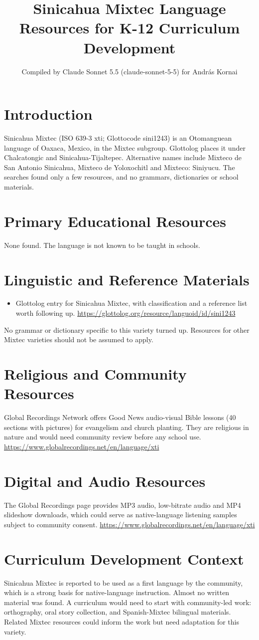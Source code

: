 \documentclass[12pt]{article}
\title{Sinicahua Mixtec Language Resources for K-12 Curriculum Development}
\author{Compiled by Claude Sonnet 5.5 (claude-sonnet-5-5) for Andr\'as Kornai}
\date{}
\begin{document}
\maketitle

\section{Introduction}
Sinicahua Mixtec (ISO 639-3 xti; Glottocode sini1243) is an Otomanguean language of Oaxaca, Mexico, in the Mixtec subgroup. Glottolog places it under Chalcatongic and Sinicahua-Tijaltepec. Alternative names include Mixteco de San Antonio Sinicahua, Mixteco de Yoloxochitl and Mixteco: Siniyucu. The searches found only a few resources, and no grammars, dictionaries or school materials.

\section{Primary Educational Resources}
None found. The language is not known to be taught in schools.

\section{Linguistic and Reference Materials}
\begin{itemize}
\item Glottolog entry for Sinicahua Mixtec, with classification and a reference list worth following up. \url{https://glottolog.org/resource/languoid/id/sini1243}
\end{itemize}
No grammar or dictionary specific to this variety turned up. Resources for other Mixtec varieties should not be assumed to apply.

\section{Religious and Community Resources}
Global Recordings Network offers Good News audio-visual Bible lessons (40 sections with pictures) for evangelism and church planting. They are religious in nature and would need community review before any school use. \url{https://www.globalrecordings.net/en/language/xti}

\section{Digital and Audio Resources}
The Global Recordings page provides MP3 audio, low-bitrate audio and MP4 slideshow downloads, which could serve as native-language listening samples subject to community consent. \url{https://www.globalrecordings.net/en/language/xti}

\section{Curriculum Development Context}
Sinicahua Mixtec is reported to be used as a first language by the community, which is a strong basis for native-language instruction. Almost no written material was found. A curriculum would need to start with community-led work: orthography, oral story collection, and Spanish-Mixtec bilingual materials. Related Mixtec resources could inform the work but need adaptation for this variety.
\end{document}
